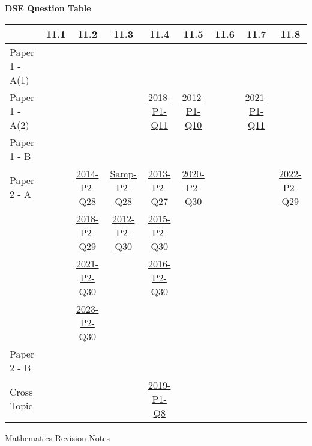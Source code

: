 \documentclass[12pt, a4paper]{article}
\begin{document}
\begin{absolutelynopagebreak}
\begin{center}
\textbf{DSE Question Table}
\end{center}
\begin{center}
\begin{tabular}{|l|c|c|c|c|c|c|c|c|}
\hline
        & 11.1 & 11.2 & 11.3 & 11.4 & 11.5 & 11.6 & 11.7 & 11.8 \\\hline
\hline
Paper 1 - A(1)&  &  &  &  &  &  &  &  \\
\hline
Paper 1 - A(2)&  &  &  & \hyperref[DSE2018-CoreP1-Q11]{2018-P1-Q11} & \hyperref[DSE2012-CoreP1-Q10]{2012-P1-Q10} &  & \hyperref[DSE2021-CoreP1-Q11]{2021-P1-Q11} &  \\
\hline
Paper 1 - B&  &  &  &  &  &  &  &  \\
\hline
\hline
Paper 2 - A&  & \hyperref[DSE2014-CoreP2-Q28]{2014-P2-Q28} & \hyperref[DSE2012S-CoreP2-Q28]{Samp-P2-Q28} & \hyperref[DSE2013-CoreP2-Q27]{2013-P2-Q27} & \hyperref[DSE2020-CoreP2-Q30]{2020-P2-Q30} &  &  & \hyperref[DSE2022-CoreP2-Q29]{2022-P2-Q29} \\
&  & \hyperref[DSE2018-CoreP2-Q29]{2018-P2-Q29} & \hyperref[DSE2012-CoreP2-Q30]{2012-P2-Q30} & \hyperref[DSE2015-CoreP2-Q30]{2015-P2-Q30} &  &  &  &  \\
&  & \hyperref[DSE2021-CoreP2-Q30]{2021-P2-Q30} &  & \hyperref[DSE2016-CoreP2-Q30]{2016-P2-Q30} &  &  &  &  \\
&  & \hyperref[DSE2023-CoreP2-Q30]{2023-P2-Q30} &  &  &  &  &  &  \\
\hline
Paper 2 - B&  &  &  &  &  &  &  &  \\
\hline
\hline
Cross Topic&  &  &  & \hyperref[DSE2019-CoreP1-Q08]{2019-P1-Q8} &  &  &  &  \\
\hline
\end{tabular}
\end{center}
\end{absolutelynopagebreak}
\newpage
\newpage
\thispagestyle{empty}
\begin{center}
Mathematics Revision Notes\\\vspace{1cm}
\\\vspace{1cm}
{\fontsize{24pt}{24pt}\selectfont {Introduction to Probability}} \\\vspace{1cm}
\label{chapter:S3-12}

\end{center}
\vspace{0.5cm}
\hline
\end{document}
